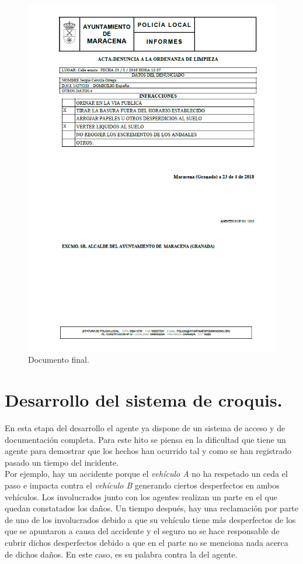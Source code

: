 \begin{figure}[H]
	\centering
	\includegraphics[scale=0.75]{imagenes/clean-res.png}
	\caption{Documento final.}
\end{figure}

\section{Desarrollo del sistema de croquis.}

En esta etapa del desarrollo el agente ya dispone de un sistema de acceso y de documentación completa. Para este hito se piensa en la dificultad que tiene un agente para 
demostrar que los hechos han ocurrido tal y como se han registrado pasado un tiempo del incidente.\\

Por ejemplo, hay un accidente porque el \textit{vehículo A} no ha respetado un ceda el paso e impacta contra el \textit{vehículo B} generando ciertos desperfectos en ambos
vehículos. Los involucrados junto con los agentes realizan un parte en el que quedan constatados los daños.  Un tiempo después, hay una reclamación por parte de uno de los
involucrados debido a que su vehículo tiene más desperfectos de los que se apuntaron a causa del accidente y el seguro no se hace responsable de cubrir dichos desperfectos
debido a que en el parte no se menciona nada acerca de dichos daños. En este caso, es su palabra contra la del agente.\\

